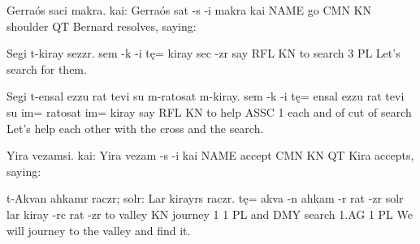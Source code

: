 \documentclass[fontsize=12pt,twoside=false,numbers=noenddot]{class/kaobook}
\newenvironment{example*}{
	\begin{minipage}{164.6mm}%
	\examples%
	\ex%
}{%
	\endexamples%
	\end{minipage}%
}%
\begin{document}
\begin{example*}
\script Gerraós saci makra. kai:
\bits Gerraós sat -s  -i  makra    kai
\gloss NAME    go CMN KN shoulder QT
\tr Bernard resolves, saying:
\end{example*}

\begin{example*}
\script Segi t-kiray sezzr.
\bits sem -k  -i  tę= kiray  sec -zr
\gloss say  RFL  KN to search 3  PL
\tr Let's search for them.
\end{example*}

\begin{example*}
\script Segi t-ensal ezzu rat tevi su m-ratosat m-kiray.
\bits sem -k  -i  tę= ensal ezzu rat tevi su  im= ratosat im= kiray
\gloss say RFL KN to help  ASSC 1   each and of cut     of search
\tr Let's help each other with the cross and the search.
\end{example*}

\begin{example*}
\script Yira vezamsi. kai:
\bits Yira vezam -s  -i  kai
\gloss NAME accept CMN KN QT
\tr Kira accepts, saying:
\end{example*}

\begin{example*}
\script t-Akvan ahkamr raczr; solr: Lar kirayrs raczr.
\bits tę= akva  -n  ahkam  -r rat -zr solr lar kiray -rc   rat -zr
\gloss to valley KN journey 1 1   PL and  DMY search 1.AG 1  PL
\tr We will journey to the valley and find it.
\end{example*}
\end{document}
